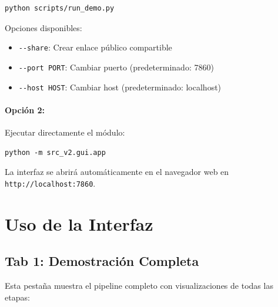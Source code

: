 \begin{verbatim}
python scripts/run_demo.py
\end{verbatim}

Opciones disponibles:
\begin{itemize}
    \item \texttt{-{}-share}: Crear enlace público compartible
    \item \texttt{-{}-port PORT}: Cambiar puerto (predeterminado: 7860)
    \item \texttt{-{}-host HOST}: Cambiar host (predeterminado: localhost)
\end{itemize}

\paragraph{Opción 2:} Ejecutar directamente el módulo:

\begin{verbatim}
python -m src_v2.gui.app
\end{verbatim}

La interfaz se abrirá automáticamente en el navegador web en \texttt{http://localhost:7860}.

\section{Uso de la Interfaz}

\subsection{Tab 1: Demostración Completa}

Esta pestaña muestra el pipeline completo con visualizaciones de todas las etapas:

